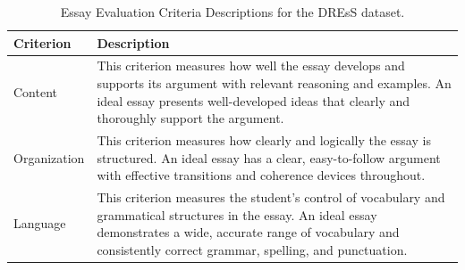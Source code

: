 \documentclass[letterpaper]{article} %
\begin{document}
\begin{table}[!h]
\centering
\renewcommand{\arraystretch}{1.4}
\begin{tabular}{|p{3.5cm}|p{10cm}|}
\hline
\textbf{Criterion} & \textbf{Description} \\
\hline
Content &
This criterion measures how well the essay develops and supports its argument with relevant reasoning and examples. An ideal essay presents well-developed ideas that clearly and thoroughly support the argument. \\
\hline
Organization &
This criterion measures how clearly and logically the essay is structured. An ideal essay has a clear, easy-to-follow argument with effective transitions and coherence devices throughout. \\
\hline
Language &
This criterion measures the student's control of vocabulary and grammatical structures in the essay. An ideal essay demonstrates a wide, accurate range of vocabulary and consistently correct grammar, spelling, and punctuation. \\
\hline
\end{tabular}
\caption{Essay Evaluation Criteria Descriptions for the DREsS dataset.}
\label{apx:dress_criteria}
\end{table}
\end{document}
